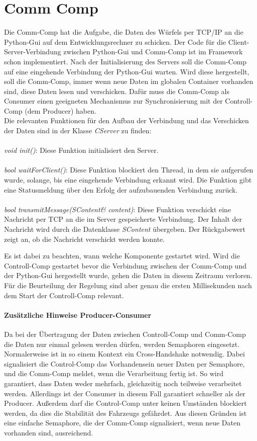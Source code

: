     \section{Comm Comp}
        Die Comm-Comp hat die Aufgabe, die Daten des Würfels per TCP/IP an die Python-Gui auf dem Entwicklungsrechner zu schicken. Der Code für die Client-Server-Verbindung zwischen Python-Gui und Comm-Comp ist im Framework schon implementiert. Nach der Initialisierung des Servers soll die Comm-Comp auf eine eingehende Verbindung der Python-Gui warten. Wird diese hergestellt, soll die Comm-Comp, immer wenn neue Daten im globalen Container vorhanden sind, diese Daten lesen und verschicken. Dafür muss die Comm-Comp als Consumer einen geeigneten Mechanismus zur Synchronisierung mit der Controll-Comp (dem Producer) haben.\\
        Die relevanten Funktionen für den Aufbau der Verbindung und das Verschicken der Daten sind in der Klasse \textit{CServer} zu finden:\\
        \\
        \textit{void init()}: Diese Funktion initialisiert den Server.\\
        \\
        \textit{bool waitForClient()}: Diese Funktion blockiert den Thread, in dem sie aufgerufen wurde, solange, bis eine eingehende Verbindung erkannt wird. Die Funktion gibt eine Statusmeldung über den Erfolg der aufzubauenden Verbindung zurück.\\
        \\
        \textit{bool transmitMessage(SContent\& content)}: Diese Funktion verschickt eine Nachricht per TCP an die im Server gespeicherte Verbindung. Der Inhalt der Nachricht wird durch die Datenklasse \textit{SContent} übergeben. Der Rückgabewert zeigt an, ob die Nachricht verschickt werden konnte.
        
        Es ist dabei zu beachten, wann welche Komponente gestartet wird. Wird die Controll-Comp gestartet bevor die Verbindung zwischen der Comm-Comp und der Python-Gui hergestellt wurde, gehen die Daten in diesem Zeitraum verloren. Für die Beurteilung der Regelung sind aber genau die ersten Millisekunden nach dem Start der Controll-Comp relevant.

        \paragraph{Zusätzliche Hinweise Producer-Consumer}
            Da bei der Übertragung der Daten zwischen Controll-Comp und Comm-Comp die Daten nur einmal gelesen werden dürfen, werden Semaphoren eingesetzt. Normalerweise ist in so einem Kontext ein Cross-Handshake notwendig. Dabei signalisiert die Control-Comp das Vorhandensein neuer Daten per Semaphore, und die Comm-Comp meldet, wenn die Verarbeitung fertig ist. So wird garantiert, dass Daten weder mehrfach, gleichzeitig noch teilweise verarbeitet werden. Allerdings ist der Consumer in diesem Fall garantiert schneller als der Producer. Außerdem darf die Control-Comp unter keinen Umständen blockiert werden, da dies die Stabilität des Fahrzeugs gefährdet. Aus diesen Gründen ist eine einfache Semaphore, die der Comm-Comp signalisiert, wenn neue Daten vorhanden sind, ausreichend.

